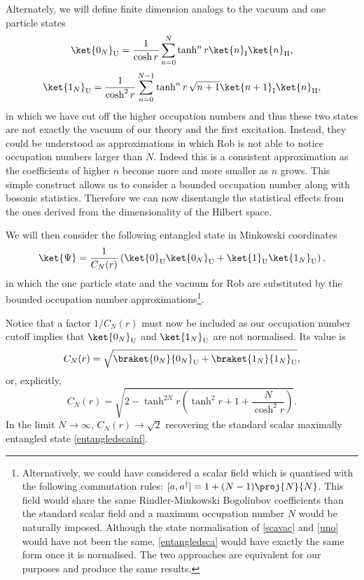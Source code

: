 Alternately, we will define finite dimension analogs to the vacuum and one particle states
\begin{equation}\label{scavac}
\ket{0_N}_\text{U}=\frac{1}{\cosh r}\sum_{n=0}^N \tanh^n r \ket{n}_{\text{I}}\ket{n}_{\text{II}},
\end{equation}
\begin{equation}\label{uno}
\ket{1_N}_\text{U}=\frac{1}{\cosh^2 r}\sum_{n=0}^{N-1} \tanh^n r \,\sqrt{n+1}\ket{n+1}_{\text{I}}\ket{n}_{\text{II}},
\end{equation} 	
in which we have cut off the higher occupation numbers and thus these two states are not exactly the vacuum of our theory and the first excitation. Instead, they could be understood as approximations in which Rob is not able to notice occupation numbers larger than $N$. Indeed this is a consistent approximation as the coefficients of higher $n$ become more and more smaller as $n$ grows. This simple construct allows us to consider a bounded occupation number along with bosonic statistics. Therefore we can now disentangle the statistical effects from the ones derived from the dimensionality of the Hilbert space. 

We will then consider the following entangled state in Minkowski coordinates
\begin{equation}
\label{entangledsca}\ket{\Psi}=\frac{1}{C_N(r)}\left(\ket{0}_\text{U}\ket{0_N}_\text{U}+\ket{1}_\text{U}\ket{1_N}_\text{U}\right),
\end{equation}
in which the one particle state and the vacuum for Rob are substituted by the bounded occupation number approximations\footnote{Alternatively, we could have considered a scalar field which is quantised with the following commutation rules: $[a,a^\dagger]=1+(N-1)\proj{N}{N}$. This field would share the same Rindler-Minkowski Bogoliubov coefficients than the standard scalar field and a maximum occupation number $N$ would be naturally imposed. Although the state normalisation of \eqref{scavac} and \eqref{uno} would have not been the same, \eqref{entangledsca} would have exactly the same form once it is normalised. The two approaches are equivalent for our purposes and produce the same results.}.

Notice that a factor $1/C_N(r)$ must now be included as our occupation number cutoff implies that $\ket{0_N}_\text{U}$ and $\ket{1_N}_\text{U}$ are not normalised. Its value is
\begin{equation}
C_N(r)=\sqrt{\braket{0_N}{0_N}_\text{U}+\braket{1_N}{1_N}_\text{U}},
\end{equation}
or, explicitly,
\begin{equation}
C_N(r)=\sqrt{2-\tanh^{2N}r\left(\tanh^2 r + 1 + \frac{N}{\cosh^2r}\right)}.
\end{equation}
In the limit $N\rightarrow\infty$, $C_{N}(r)\rightarrow\sqrt2$ recovering the standard scalar maximally entangled state \eqref{entangledscainf}.

